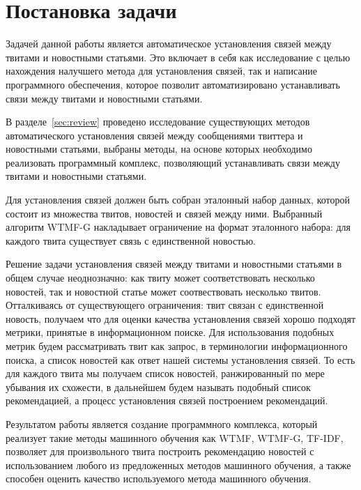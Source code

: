 \section{Постановка задачи}
    Задачей данной работы является автоматическое установления связей между твитами и новостными статьями.
    Это включает в себя как исследование с целью нахождения налучшего метода для установления связей, так и написание программного обеспечения,
    которое позволит автоматизировано устанавливать связи между твитами и новостными статьями.

    В разделе~\ref{sec:review} проведено исследование существующих методов автоматического установления связей между сообщениями твиттера и новостными статьями,
     выбраны методы, на основе которых необходимо реализовать программный комплекс, позволяющий устанавливать связи между твитами и новостными статьями.

    Для установления связей должен быть собран эталонный набор данных, которой состоит из множества твитов, новостей и связей между ними. Выбранный алгоритм WTMF-G накладывает ограничение на формат эталонного набора: для каждого твита существует связь с единственной новостью.

    Решение задачи установления связей между твитами и новостными статьями в общем случае неоднозначно:
    как твиту может соответствовать несколько новостей, так и новостной статье может соотвествовать несколько твитов.
    Отталкиваясь от существующего ограничения: твит связан с единственной новость, получаем что для оценки качества установления связей хорошо подходят метрики, принятые в информационном поиске.
    Для использования подобных метрик будем рассматривать твит как запрос, в терминологии информационного поиска, а список новостей как ответ нашей системы установления связей. То есть для каждого твита мы получаем список новостей, ранжированный по мере убывания их схожести, в дальнейшем будем называть подобный список рекомендацией, а процесс установления связей построением рекомендаций.

    Результатом работы является создание программного комплекса, который реализует такие методы машинного обучения как WTMF, WTMF-G, TF-IDF,
    позволяет для произвольного твита построить рекомендацию новостей с использованием любого из предложенных методов машинного обучения,
    а также способен оценить качество используемого метода машинного обучения.